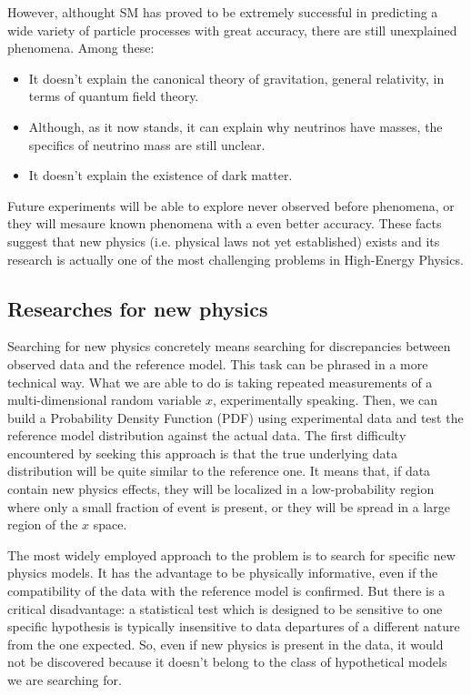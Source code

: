 \noindent
However, althought SM has proved to be extremely successful in predicting a wide variety of particle processes with great accuracy, there are still unexplained phenomena. Among these:
\begin{itemize}
    \item It doesn't explain the canonical theory of gravitation, general relativity, in terms of quantum field theory\footnotemark.
    \item Although, as it now stands, it can explain why neutrinos have masses, the specifics of neutrino mass are still unclear.
    \item It doesn't explain the existence of dark matter.
\end{itemize}
Future experiments will be able to explore never observed before phenomena, or they will mesaure known phenomena with a even better accuracy. These facts suggest that new physics (i.e. physical laws not yet established) exists and its research is actually one of the most challenging problems in High-Energy Physics.



\subsection{Researches for new physics}
Searching for new physics concretely means searching for discrepancies between observed data and the reference model. This task can be phrased in a more technical way. What we are able to do is taking repeated measurements of a multi-dimensional random variable $x$, experimentally speaking. Then, we can build a Probability Density Function (PDF) using experimental data and test the reference model distribution against the actual data. The first difficulty encountered by seeking this approach is that the true underlying data distribution will be quite similar to the reference one. It means that, if data contain new physics effects, they will be localized in a low-probability region where only a small fraction of event is present, or they will be spread in a large region of the $x$ space.

The most widely employed approach to the problem is to search for specific new physics models. It has the advantage to be physically informative, even if the compatibility of the data with the reference model is confirmed. But there is a critical disadvantage: a statistical test which is designed to be sensitive to one specific hypothesis is typically insensitive to data departures of a different nature from the one expected. So, even if new physics is present in the data, it would not be discovered because it doesn't belong to the class of hypothetical models we are searching for.




